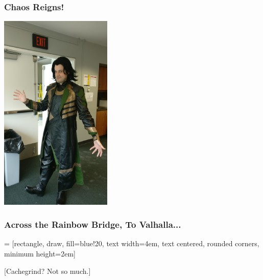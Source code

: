 

\begin{frame}
\frametitle{Chaos Reigns!}

\begin{center}
\includegraphics[width=0.4\textwidth]{images/Loki.jpg}
\end{center}

\end{frame}


\begin{frame}
\frametitle{Across the Rainbow Bridge, To Valhalla...}


 = [rectangle, draw, fill=blue!20, 
    text width=4em, text centered, rounded corners, minimum height=2em]

\begin{center}
\end{center}

\Large
[Cachegrind? Not so much.]





\end{frame}


